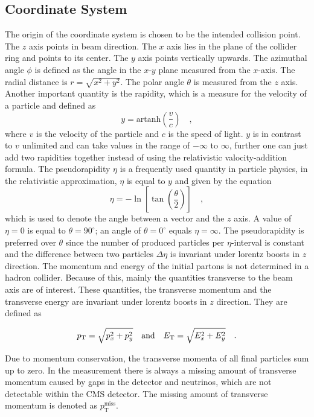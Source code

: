 \subsection*{Coordinate System}
The origin of the coordinate system is chosen to be the intended collision point. The $z$ axis points in beam direction. The $x$ axis lies in the plane of the collider ring and points to its center. The $y$ axis points vertically upwards. The azimuthal angle $\phi$ is defined as the angle in the $x$-$y$ plane measured from the $x$-axis. The radial distance is $r = \sqrt{x^2 + y^2}$. The polar angle $\theta$ is measured from the $z$ axis. Another important quantity is the rapidity, which is a measure for the velocity of a particle and defined as
\begin{equation}
y = \textrm{artanh}\left(\frac{v}{c}\right) \quad ,
\end{equation}
where $v$ is the velocity of the particle and $c$ is the speed of light. $y$ is in contrast to $v$ unlimited and can take values in the range of $-\infty$ to $\infty$, further one can just add two rapidities together instead of using the relativistic valocity-addition formula. The pseudorapidity $\eta$ is a frequently used quantity in particle physics, in the relativistic approximation, $\eta$ is equal to $y$ and given by the equation
\begin{equation}
\eta = -\ln\left[\tan\left(\frac{\theta}{2}\right)\right] \quad ,
\end{equation}
which is used to denote the angle between a vector and the $z$ axis. A value of $\eta = 0$ is equal to $\theta = 90^{\circ}$; an angle of $\theta = 0^{\circ}$ equals $\eta = \infty$. The pseudorapidity is preferred over $\theta$ since the number of produced particles per $\eta$-interval is constant and the difference between two particles $\Delta\eta$ is invariant under lorentz boosts in $z$ direction. The momentum and energy of the initial partons is not determined in a hadron collider. Because of this, mainly the quantities transverse to the beam axis are of interest. These quantities, the transverse momentum \pt and the transverse energy \Et are invariant under lorentz boosts in $z$ direction. They are defined as 

\begin{equation}
p_\mathrm{T} = \sqrt{p_{x}^2 + p_{y}^2} \quad \textrm{and} \quad E_\mathrm{T} = \sqrt{E_x^2 + E_y^2} \quad .
\end{equation} 

Due to momentum conservation, the transverse momenta of all final particles sum up to zero. In the measurement there is always a missing amount of transverse momentum caused by gaps in the detector and neutrinos, which are not detectable within the CMS detector. The missing amount of transverse momentum is denoted as $p_\textrm{T}^{\textrm{miss}}$. 

